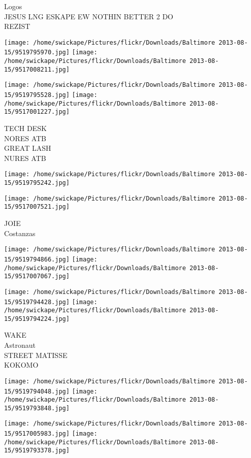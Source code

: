 \documentclass[10pt,letterpaper]{article}
\begin{document}
Logos\\
JESUS LNG ESKAPE EW NOTHIN BETTER 2 DO\\
REZIST\\
\pagebreak

\texttt{[image: /home/swickape/Pictures/flickr/Downloads/Baltimore 2013-08-15/9519795970.jpg]}
\texttt{[image: /home/swickape/Pictures/flickr/Downloads/Baltimore 2013-08-15/9517008211.jpg]}

\texttt{[image: /home/swickape/Pictures/flickr/Downloads/Baltimore 2013-08-15/9519795528.jpg]}
\texttt{[image: /home/swickape/Pictures/flickr/Downloads/Baltimore 2013-08-15/9517001227.jpg]}

TECH DESK\\
NORES ATB\\
GREAT LASH\\
NURES ATB\\
\pagebreak

\texttt{[image: /home/swickape/Pictures/flickr/Downloads/Baltimore 2013-08-15/9519795242.jpg]}

\vspace{0.25in}
\texttt{[image: /home/swickape/Pictures/flickr/Downloads/Baltimore 2013-08-15/9517007521.jpg]}

JOIE\\
Costanzas\\
\pagebreak

\texttt{[image: /home/swickape/Pictures/flickr/Downloads/Baltimore 2013-08-15/9519794866.jpg]}
\texttt{[image: /home/swickape/Pictures/flickr/Downloads/Baltimore 2013-08-15/9517007067.jpg]}

\texttt{[image: /home/swickape/Pictures/flickr/Downloads/Baltimore 2013-08-15/9519794428.jpg]}
\texttt{[image: /home/swickape/Pictures/flickr/Downloads/Baltimore 2013-08-15/9519794224.jpg]}

WAKE\\
Astronaut\\
STREET MATISSE\\
KOKOMO\\
\pagebreak

\texttt{[image: /home/swickape/Pictures/flickr/Downloads/Baltimore 2013-08-15/9519794048.jpg]}
\texttt{[image: /home/swickape/Pictures/flickr/Downloads/Baltimore 2013-08-15/9519793848.jpg]}

\texttt{[image: /home/swickape/Pictures/flickr/Downloads/Baltimore 2013-08-15/9517005983.jpg]}
\texttt{[image: /home/swickape/Pictures/flickr/Downloads/Baltimore 2013-08-15/9519793378.jpg]}
\end{document}
